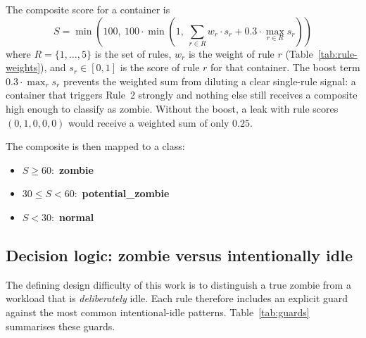 \documentclass[11pt,a4paper,oneside]{article}
\begin{document}
The composite score for a container is
\[
S = \min\!\left(100,\ 100 \cdot \min\!\left(1,\
        \sum_{r \in R} w_r \cdot s_r + 0.3 \cdot \max_{r \in R} s_r
    \right)\right)
\]
where \(R = \{1,\ldots,5\}\) is the set of rules,
\(w_r\) is the weight of rule \(r\) (Table~\ref{tab:rule-weights}),
and \(s_r \in [0,1]\) is the score of rule \(r\) for that container.
The boost term \(0.3 \cdot \max_{r} s_r\) prevents the weighted sum from
diluting a clear single-rule signal: a container that triggers Rule~2
strongly and nothing else still receives a composite high enough to
classify as zombie. Without the boost, a leak with rule scores
\((0, 1, 0, 0, 0)\) would receive a weighted sum of only \(0.25\).

The composite is then mapped to a class:

\begin{itemize}[leftmargin=*]
\item \(S \ge 60\):\ \textbf{zombie}
\item \(30 \le S < 60\):\ \textbf{potential\_zombie}
\item \(S < 30\):\ \textbf{normal}
\end{itemize}

\subsection{Decision logic: zombie versus intentionally idle}
\label{sec:decision}

The defining design difficulty of this work is to distinguish a true
zombie from a workload that is \emph{deliberately} idle. Each rule
therefore includes an explicit guard against the most common
intentional-idle patterns. Table~\ref{tab:guards} summarises these
guards.
\end{document}
